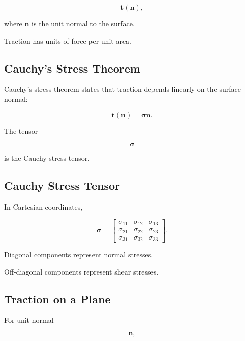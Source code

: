 \[
\boxed{
\mathbf{t}(\mathbf{n}),
}
\]

where \(\mathbf{n}\) is the unit normal to the surface.

Traction has units of force per unit area.

\subsection{Cauchy's Stress Theorem}
\label{subsec:cauchy-stress-theorem}

Cauchy's stress theorem states that traction depends linearly on the surface
normal:

\[
\boxed{
\mathbf{t}(\mathbf{n})
=
\boldsymbol{\sigma}\mathbf{n}.
}
\]

The tensor

\[
\boxed{
\boldsymbol{\sigma}
}
\]

is the Cauchy stress tensor.

\subsection{Cauchy Stress Tensor}
\label{subsec:cauchy-stress-tensor}

In Cartesian coordinates,

\[
\boxed{
\boldsymbol{\sigma}
=
\begin{bmatrix}
\sigma_{11} & \sigma_{12} & \sigma_{13}\\
\sigma_{21} & \sigma_{22} & \sigma_{23}\\
\sigma_{31} & \sigma_{32} & \sigma_{33}
\end{bmatrix}.
}
\]

Diagonal components represent normal stresses.

Off-diagonal components represent shear stresses.

\subsection{Traction on a Plane}
\label{subsec:traction-plane}

For unit normal

\[
\mathbf{n},
\]

